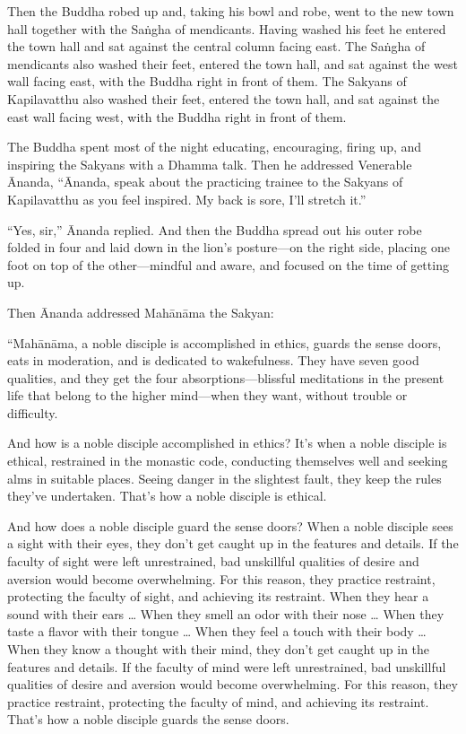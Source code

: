 \documentclass[12pt,openany]{book}%
\begin{document}
Then the Buddha robed up and, taking his bowl and robe, went to the new town hall together with the \textsanskrit{Saṅgha} of mendicants. Having washed his feet he entered the town hall and sat against the central column facing east. The \textsanskrit{Saṅgha} of mendicants also washed their feet, entered the town hall, and sat against the west wall facing east, with the Buddha right in front of them. The Sakyans of Kapilavatthu also washed their feet, entered the town hall, and sat against the east wall facing west, with the Buddha right in front of them. 

The Buddha spent most of the night educating, encouraging, firing up, and inspiring the Sakyans with a Dhamma talk. Then he addressed Venerable Ānanda, “Ānanda, speak about the practicing trainee to the Sakyans of Kapilavatthu as you feel inspired. My back is sore, I’ll stretch it.” 

“Yes, sir,” Ānanda replied. And then the Buddha spread out his outer robe folded in four and laid down in the lion’s posture—on the right side, placing one foot on top of the other—mindful and aware, and focused on the time of getting up. 

Then Ānanda addressed \textsanskrit{Mahānāma} the Sakyan: 

“\textsanskrit{Mahānāma}, a noble disciple is accomplished in ethics, guards the sense doors, eats in moderation, and is dedicated to wakefulness. They have seven good qualities, and they get the four absorptions—blissful meditations in the present life that belong to the higher mind—when they want, without trouble or difficulty. 

And how is a noble disciple accomplished in ethics? It’s when a noble disciple is ethical, restrained in the monastic code, conducting themselves well and seeking alms in suitable places. Seeing danger in the slightest fault, they keep the rules they’ve undertaken. That’s how a noble disciple is ethical. 

And how does a noble disciple guard the sense doors? When a noble disciple sees a sight with their eyes, they don’t get caught up in the features and details. If the faculty of sight were left unrestrained, bad unskillful qualities of desire and aversion would become overwhelming. For this reason, they practice restraint, protecting the faculty of sight, and achieving its restraint. When they hear a sound with their ears … When they smell an odor with their nose … When they taste a flavor with their tongue … When they feel a touch with their body … When they know a thought with their mind, they don’t get caught up in the features and details. If the faculty of mind were left unrestrained, bad unskillful qualities of desire and aversion would become overwhelming. For this reason, they practice restraint, protecting the faculty of mind, and achieving its restraint. That’s how a noble disciple guards the sense doors. 
\end{document}
